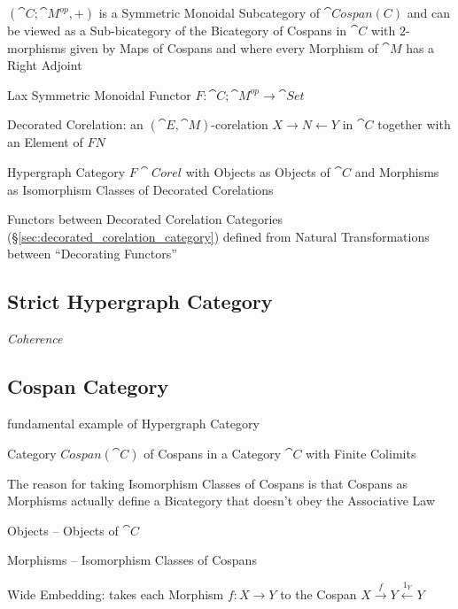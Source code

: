 $(\cat{C};\cat{M}^{op}, +)$ is a Symmetric Monoidal Subcategory of
$\cat{Cospan(C)}$ and can be viewed as a Sub-bicategory of the
Bicategory of Cospans in $\cat{C}$ with $2$-morphisms given by Maps of
Cospans and where every Morphism of $\cat{M}$ has a Right Adjoint

Lax Symmetric Monoidal Functor $F : \cat{C};\cat{M}^{op} \rightarrow
\cat{Set}$

Decorated Corelation: an $(\cat{E},\cat{M})$-corelation $X \rightarrow
N \leftarrow Y$ in $\cat{C}$ together with an Element of $F N$ %

Hypergraph Category $F\cat{Corel}$ with Objects as Objects of
$\cat{C}$ and Morphisms as Isomorphism Classes of Decorated
Corelations

Functors between Decorated Corelation Categories
(\S\ref{sec:decorated_corelation_category}) defined from Natural
Transformations between ``Decorating Functors'' %



\subsection{Strict Hypergraph Category}
\label{sec:strict_hypergraph_category}

\emph{Coherence}



\subsection{Cospan Category}\label{sec:cospan_category}

fundamental example of Hypergraph Category

Category $Cospan(\cat{C})$ of Cospans in a Category $\cat{C}$ with
Finite Colimits

\fist The reason for taking Isomorphism Classes of Cospans is that
Cospans as Morphisms actually define a Bicategory that doesn't obey
the Associative Law %

Objects -- Objects of $\cat{C}$

Morphisms -- Isomorphism Classes of Cospans

Wide Embedding: takes each Morphism $f : X \rightarrow Y$ to the
Cospan $X \xrightarrow{f} Y \xleftarrow{1_Y} Y$

